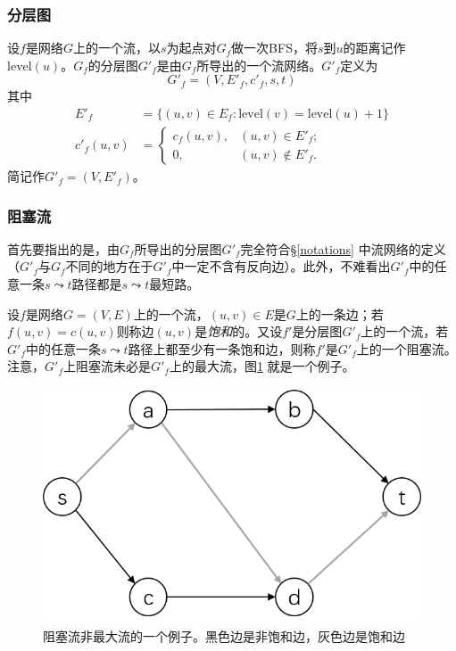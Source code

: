 \documentclass[a4paper]{ctexbook}
\begin{document}
  \subsubsection*{分层图}
  设$f$是网络$G$上的一个流，以$s$为起点对$G_f$做一次BFS，将$s$到$u$的距离记作$\mathrm{level}(u)$。$G_f$的分层图$G'_f$是由$G_f$所导出的一个流网络。$G'_f$定义为
  \[
  G'_f =(V, E'_f, c'_f, s, t)
  \]
  其中
  \begin{align*}
      E'_f &= \{(u,v)\in E_f\colon \mathrm{level}(v) = \mathrm{level}(u)+1\} \\
      c'_f(u,v) &=\begin{cases}
      c_f(u,v), & (u,v)\in E'_f;\\
      0, & (u,v)\notin E'_f.\end{cases}
  \end{align*}
  简记作$G'_f =(V, E'_f)$。
  \subsubsection{阻塞流}
  首先要指出的是，由$G_f$所导出的分层图$G'_f$完全符合\S\ref{notations} 中流网络的定义（$G'_f$与$G_f$不同的地方在于$G'_f$中一定不含有反向边）。此外，不难看出$G'_f$中的任意一条$s\leadsto t$路径都是$s\leadsto t$最短路。

  设$f$是网络$G=(V,E)$上的一个流，$(u,v)\in E$是$G$上的一条边；若$f(u,v) = c(u,v)$则称边$(u,v)$是\emph{饱和}的。又设$f'$是分层图$G'_f$上的一个流，若$G'_f$中的任意一条$s\leadsto t$路径上都至少有一条饱和边，则称$f'$是$G'_f$上的一个阻塞流。注意，$G'_f$上阻塞流未必是$G'_f$上的最大流，图\ref{Fig:blocking-flow} 就是一个例子。
  \begin{figure}
      \centering
      \includegraphics[scale=0.5]{figures/blocking-flow.png}
      \caption{阻塞流非最大流的一个例子。黑色边是非饱和边，灰色边是饱和边}
      \label{Fig:blocking-flow}
  \end{figure}
\end{document}
